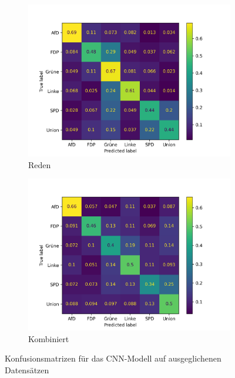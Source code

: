 \begin{figure}[H]
\begin{subfigure}{0.49\textwidth}
    \includegraphics[width=\textwidth]{data/images/modeling/cnn/under/speeches_confusion_matrix.png}
    \caption{Reden}
    \label{sfig:confusionMatrixCnnSpeeches}
  \end{subfigure}
  \hfill
  \begin{subfigure}{0.49\textwidth}
    \includegraphics[width=\textwidth]{data/images/modeling/cnn/under/all_confusion_matrix.png}
    \caption{Kombiniert}
    \label{sfig:confusionMatrixCnnAll}
  \end{subfigure}
  \caption{Konfusionsmatrizen für das \acs{CNN}-Modell auf ausgeglichenen Datensätzen} \label{fig:confusionMatrixCnn}
\end{figure}

